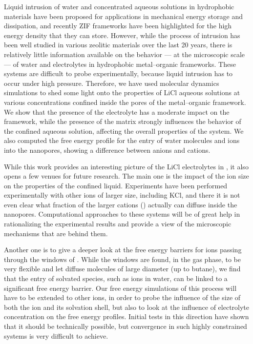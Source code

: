 \documentclass[thesis]{subfiles}
\begin{document}
Liquid intrusion of water and concentrated aqueous solutions in hydrophobic
materials have been proposed for applications in mechanical energy storage and
dissipation, and recently ZIF frameworks have been highlighted for the high
energy density that they can store. However, while the process of intrusion has
been well studied in various zeolitic materials over the last 20 years, there is
relatively little information available on the behavior --- at the microscopic
scale --- of water and electrolytes in hydrophobic metal--organic frameworks.
These systems are difficult to probe experimentally, because liquid intrusion
has to occur under high pressure. Therefore, we have used molecular dynamics
simulations to shed some light onto the properties of LiCl aqueous solutions at
various concentrations confined inside the pores of the  metal--organic
framework. We show that the presence of the electrolyte has a moderate impact on
the  framework, while the presence of the  matrix strongly influences
the behavior of the confined aqueous solution, affecting the overall properties
of the system. We also computed the free energy profile for the entry of water
molecules and ions into the nanopores, showing a difference between anions and
cations.

While this work provides an interesting picture of the LiCl electrolytes in
, it also opens a few venues for future research. The main one is the
impact of the ion size on the properties of the confined liquid. Experiments
have been performed experimentally with other ions of larger size, including
KCl, and there it is not even clear what fraction of the larger cations
() actually can diffuse inside the nanopores. Computational approaches to
these systems will be of great help in rationalizing the experimental results
and provide a view of the microscopic mechanisms that are behind them.

Another one is to give a deeper look at the free energy barriers for ions
passing through the windows of . While the windows are found, in the gas
phase, to be very flexible and let diffuse molecules of large diameter (up to
butane), we find that the entry of solvated species, such as ions in water, can
be linked to a significant free energy barrier. Our free energy simulations of
this process will have to be extended to other ions, in order to probe the
influence of the size of both the ion and its solvation shell, but also to look
at the influence of electrolyte concentration on the free energy profiles.
Initial tests in this direction have shown that it should be technically
possible, but convergence in such highly constrained systems is very difficult
to achieve.
\end{document}
